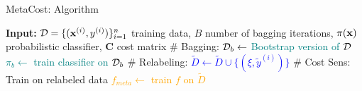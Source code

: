 \documentclass[11pt,compress,t,notes=noshow, xcolor=table]{beamer}
\begin{document}
\begin{vbframe}{MetaCost: Algorithm}
	
		

		
			\begin{algorithmic}
				
				\footnotesize
%				
				\State \textbf{Input:} 
				$\mathcal{D} = \{(\mathbf{x}^{(i)},y^{(i)})\}_{i=1}^n$ training data, $B$ number of bagging iterations,
				$\pi(\mathbf{x})$ probabilistic classifier,
				$\mathbf{C}$ cost matrix 
				  \State \# Bagging:
\textcolor{teal}{
    \State $\mathcal{D}_b \leftarrow $ Bootstrap version of $\mathcal{D}$
    \State $\pi_b \leftarrow $ train classifier on $\mathcal{D}_b$ 
\EndFor
} 
\State \# Relabeling:
\textcolor{blue}{
\State $\tilde D \leftarrow \tilde D \cup \{(\xi,\tilde y^{(i)})\} $
\EndFor
}    
\State \# Cost Sens: Train on relabeled data
\textcolor{orange}{\State $f_{meta} \leftarrow$ train $f$ on $\tilde D$}
\end{algorithmic}

\end{vbframe}

\endlecture
\end{document}
